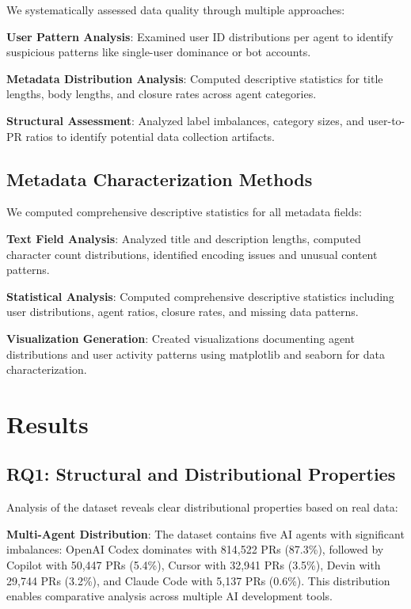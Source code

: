 \documentclass[conference]{IEEEtran}
\begin{document}
We systematically assessed data quality through multiple approaches:

\textbf{User Pattern Analysis}: Examined user ID distributions per agent to identify suspicious patterns like single-user dominance or bot accounts.

\textbf{Metadata Distribution Analysis}: Computed descriptive statistics for title lengths, body lengths, and closure rates across agent categories.

\textbf{Structural Assessment}: Analyzed label imbalances, category sizes, and user-to-PR ratios to identify potential data collection artifacts.

\subsection{Metadata Characterization Methods}

We computed comprehensive descriptive statistics for all metadata fields:

\textbf{Text Field Analysis}: Analyzed title and description lengths, computed character count distributions, identified encoding issues and unusual content patterns.

\textbf{Statistical Analysis}: Computed comprehensive descriptive statistics including user distributions, agent ratios, closure rates, and missing data patterns.

\textbf{Visualization Generation}: Created visualizations documenting agent distributions and user activity patterns using matplotlib and seaborn for data characterization.

\section{Results}

\subsection{RQ1: Structural and Distributional Properties}

Analysis of the dataset reveals clear distributional properties based on real data:

\textbf{Multi-Agent Distribution}: The dataset contains five AI agents with significant imbalances: OpenAI Codex dominates with 814,522 PRs (87.3\%), followed by Copilot with 50,447 PRs (5.4\%), Cursor with 32,941 PRs (3.5\%), Devin with 29,744 PRs (3.2\%), and Claude Code with 5,137 PRs (0.6\%). This distribution enables comparative analysis across multiple AI development tools.
\end{document}
